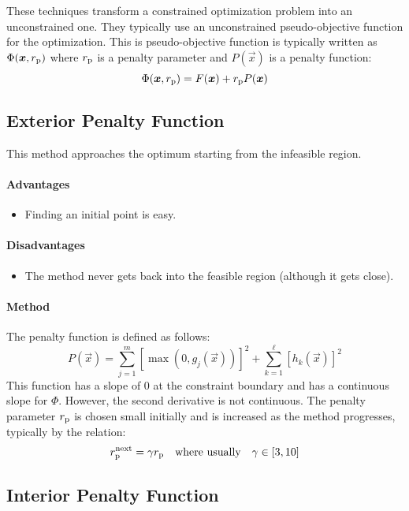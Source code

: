 \documentclass{article}
\begin{document}
These techniques transform a constrained optimization problem into an unconstrained one. They
typically use an unconstrained pseudo-objective function for the optimization. This is
pseudo-objective function is typically written as \(\Phi(\bm{x}, r_{\mathrm{p}})\) where \(r_{\mathrm{p}}\)
is a penalty parameter and \(P(\vec{x})\) is a penalty function:
\[\Phi(\bm{x}, r_{\mathrm{p}}) = F(\bm{x}) + r_{\mathrm{p}} P(\bm{x})\]

\subsection{Exterior Penalty Function}

This method approaches the optimum starting from the infeasible region.

\paragraph{Advantages}
\begin{itemize}
\item Finding an initial point is easy.
\end{itemize}

\paragraph{Disadvantages}
\begin{itemize}
\item The method never gets back into the feasible region (although it gets close).
\end{itemize}

\paragraph{Method}
The penalty function is defined as follows:
\[P(\vec{x})
= \sum_{j=1}^m{\left[\max\left(0, g_j(\vec{x})\right)\right]}^2
+ \sum_{k=1}^\ell{\left[h_k(\vec{x})\right]}^2\]
This function has a slope of 0 at the constraint boundary and has a continuous slope for
\(\Phi\). However, the second derivative is not continuous. The penalty parameter \(r_{\mathrm{p}}\) is
chosen small initially and is increased as the method progresses, typically by the relation:
\[r_{\mathrm{p}}^\textrm{next} = \gamma r_{\mathrm{p}} \quad \textrm{where usually} \quad \gamma \in [3, 10]\]

\subsection{Interior Penalty Function}
\end{document}
